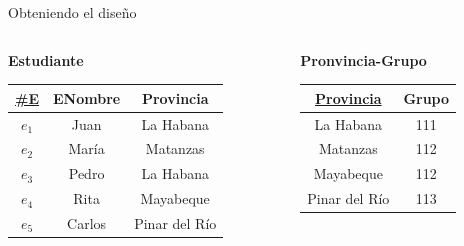 \begin{frame}{Obteniendo el dise\~no}
    \begin{columns}[T]
        \begin{column}{0.68\linewidth}
            \begin{columns}[T]
                \begin{column}{0.6\textwidth}
                    \begin{center}
                        \textbf{Estudiante}\\[2mm]
        
                        \begin{tabular}{ccc}
                            \underline{\#E} & ENombre & Provincia\\[1mm]
                            \hline
                            $e_1$ & Juan & La Habana\\
                            $e_2$ & Mar\'ia & Matanzas\\
                            $e_3$ & Pedro & La Habana\\
                            $e_4$ & Rita & Mayabeque\\
                            $e_5$ & Carlos & Pinar del R\'io
                        \end{tabular}
                    \end{center}
                \end{column}

                \begin{column}{0.4\textwidth}
                    \begin{center}
                        \textbf{Pronvincia-Grupo}\\[2mm]
        
                        \begin{tabular}{cc}
                            \underline{Provincia} & Grupo\\[1mm]
                            \hline
                            La Habana & 111\\
                            Matanzas & 112 \\
                            Mayabeque & 112 \\
                            Pinar del R\'io & 113
                            
                        \end{tabular}
                    \end{center}
                \end{column}
                

\end{columns}
\end{column}
\end{columns}
\end{frame}
